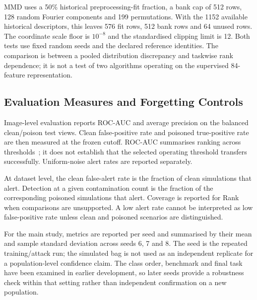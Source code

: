 MMD uses a 50\% historical preprocessing-fit fraction, a bank cap of 512
rows, 128 random Fourier components and 199 permutations. With the
1152 available historical descriptors, this leaves 576 fit rows, 512 bank
rows and 64 unused rows. The coordinate scale floor is $10^{-8}$ and the
standardised clipping limit is 12. Both tests use fixed random seeds and
the declared reference identities. The comparison is between a pooled
distribution discrepancy and taskwise rank dependence; it is not a test
of two algorithms operating on the supervised 84-feature representation.

\subsection{Evaluation Measures and Forgetting Controls}
\label{subsec:setup-metrics}

Image-level evaluation reports ROC-AUC and average precision on the
balanced clean/poison test views. Clean false-positive rate and poisoned
true-positive rate are then measured at the frozen cutoff. ROC-AUC
summarises ranking across thresholds~\cite{fawcett2006roc}; it does not
establish that the selected operating threshold transfers successfully.
Uniform-noise alert rates are reported separately.

At dataset level, the clean false-alert rate is the fraction of clean
simulations that alert. Detection at a given contamination count is the
fraction of the corresponding poisoned simulations that alert. Coverage
is reported for Rank when comparisons are unsupported. A low alert rate
cannot be interpreted as low false-positive rate unless clean and
poisoned scenarios are distinguished.

For the main study, metrics are reported per seed and summarised by their
mean and sample standard deviation across seeds 6, 7 and 8. The seed is
the repeated training/attack run; the simulated bag is not used as an
independent replicate for a population-level confidence claim. The
class order, benchmark and final task have been examined in earlier
development, so later seeds provide a robustness check within that
setting rather than independent confirmation on a new population.

